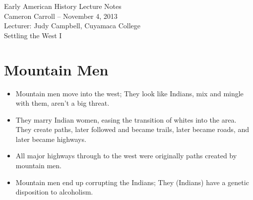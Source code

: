 \documentclass{article}
\begin{document}
\begin{center}
    {\small{} Early American History Lecture Notes} \\[0.6cm]
    {\small{} Cameron Carroll -- November 4, 2013} \\[0.6cm]
    {\small{} Lecturer: Judy Campbell, Cuyamaca College}\\[1cm]
    {\small{} Settling the West I}\\[1cm]
\end{center}
  
\tableofcontents
\newpage

\section{Mountain Men}
  \begin{itemize}
    \item Mountain men move into the west; They look like Indians, mix and mingle with them, aren't a big threat.
    \item They marry Indian women, easing the transition of whites into the area. They create paths, later followed and became trails, later became roads, and later became highways.
    \item All major highways through to the west were originally paths created by mountain men.
    \item Mountain men end up corrupting the Indians; They (Indians) have a genetic disposition to alcoholism.
  \end{itemize}
\end{document}
